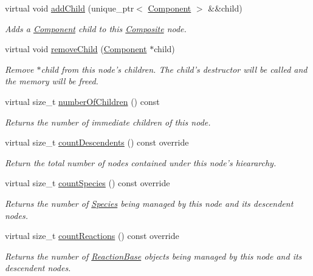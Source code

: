 \begin{DoxyCompactItemize}
virtual void \hyperlink{classComposite_aa3ebdb54e65379954e5f28cd84f00be0}{add\+Child} (unique\+\_\+ptr$<$ \hyperlink{classComponent}{Component} $>$ \&\&child)
\begin{DoxyCompactList}\small\item\em Adds a \hyperlink{classComponent}{Component} child to this \hyperlink{classComposite}{Composite} node. \end{DoxyCompactList}\item 
virtual void \hyperlink{classComposite_a1e62d11f4c16844277b215a2069c14be}{remove\+Child} (\hyperlink{classComponent}{Component} $\ast$child)
\begin{DoxyCompactList}\small\item\em Remove $\ast$child from this node's children. The child's destructor will be called and the memory will be freed. \end{DoxyCompactList}\item 
virtual size\+\_\+t \hyperlink{classComposite_ab00f34ad7c8f7cd90ea9392bd54fd62a}{number\+Of\+Children} () const 
\begin{DoxyCompactList}\small\item\em Returns the number of immediate children of this node. \end{DoxyCompactList}\item 
virtual size\+\_\+t \hyperlink{classComposite_aad7cea9220c003254233ec9dc6bcb24e}{count\+Descendents} () const override
\begin{DoxyCompactList}\small\item\em Return the total number of nodes contained under this node's hieararchy. \end{DoxyCompactList}\item 
virtual size\+\_\+t \hyperlink{classComposite_ad3162a869285627b04c5388dc28e2719}{count\+Species} () const override
\begin{DoxyCompactList}\small\item\em Returns the number of \hyperlink{classSpecies}{Species} being managed by this node and its descendent nodes. \end{DoxyCompactList}\item 
virtual size\+\_\+t \hyperlink{classComposite_a14108b9a4f9e903ba0fd9cc40fbbd8ae}{count\+Reactions} () const override
\begin{DoxyCompactList}\small\item\em Returns the number of \hyperlink{classReactionBase}{Reaction\+Base} objects being managed by this node and its descendent nodes. \end{DoxyCompactList}\item 

\end{DoxyCompactItemize}
